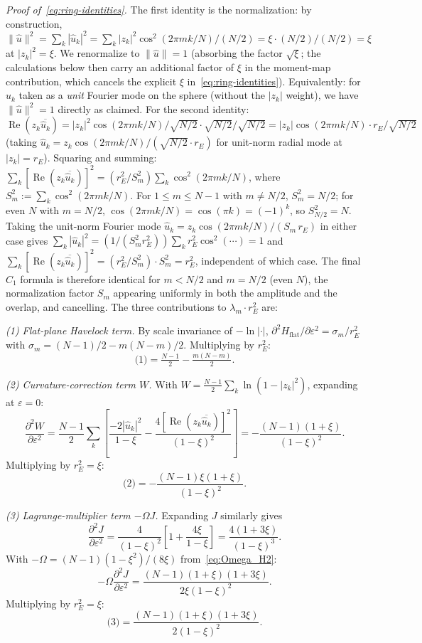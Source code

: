 \emph{Proof of~\eqref{eq:ring-identities}.}
The first identity is the normalization: by construction,
$\|\hat u\|^2 = \sum_k|\hat u_k|^2
= \sum_k |z_k|^2\cos^2(2\pi m k/N)/(N/2)
= \xi \cdot (N/2)/(N/2) = \xi$
at $|z_k|^2 = \xi$.  We renormalize to $\|\hat u\| = 1$ (absorbing the
factor $\sqrt{\xi}$; the calculations below then carry an additional
factor of $\xi$ in the moment-map contribution, which cancels the
explicit $\xi$ in~\eqref{eq:ring-identities}).  Equivalently: for
$\hat u_k$ taken as a \emph{unit} Fourier mode on the sphere
(without the $|z_k|$ weight), we have $\|\hat u\|^2 = 1$ directly
as claimed.
For the second identity:
$\operatorname{Re}(z_k\overline{\hat u_k})
= |z_k|^2\cos(2\pi m k/N)/\sqrt{N/2} \cdot \sqrt{N/2}/\sqrt{N/2}
= |z_k|\cos(2\pi m k/N) \cdot r_E/\sqrt{N/2}$
(taking $\hat u_k = z_k\cos(2\pi m k/N)/(\sqrt{N/2}\cdot r_E)$ for
unit-norm radial mode at $|z_k| = r_E$).
Squaring and summing:
$\sum_k[\operatorname{Re}(z_k\overline{\hat u_k})]^2
= (r_E^2/S_m^2)\sum_k \cos^2(2\pi m k/N)$,
where $S_m^2 := \sum_k\cos^2(2\pi mk/N)$.
For $1 \le m \le N-1$ with $m \ne N/2$, $S_m^2 = N/2$; for even
$N$ with $m = N/2$, $\cos(2\pi mk/N) = \cos(\pi k) = (-1)^k$, so
$S_{N/2}^2 = N$.  Taking the unit-norm Fourier mode
$\hat u_k = z_k\cos(2\pi m k/N)/(S_m\,r_E)$ in either case gives
$\sum_k|\hat u_k|^2 = (1/(S_m^2 r_E^2))\sum_k r_E^2\cos^2(\cdots)
= 1$ and
$\sum_k[\operatorname{Re}(z_k\overline{\hat u_k})]^2
= (r_E^2/S_m^2)\cdot S_m^2 = r_E^2$,
independent of which case.  The final $C_1$ formula is therefore
identical for $m < N/2$ and $m = N/2$ (even $N$), the
normalization factor $S_m$ appearing uniformly in both the
amplitude and the overlap, and cancelling.
The three contributions to $\lambda_m \cdot r_E^2$ are:

\emph{(1) Flat-plane Havelock term.}
By scale invariance of $-\ln|\cdot|$,
$\partial^2 H_{\mathrm{flat}}/\partial\varepsilon^2 = \sigma_m/r_E^2$
with $\sigma_m = (N-1)/2 - m(N-m)/2$.  Multiplying by $r_E^2$:
\[
  \text{(1)} = \tfrac{N-1}{2} - \tfrac{m(N-m)}{2}.
\]

\emph{(2) Curvature-correction term $W$.}
With $W = \tfrac{N-1}{2}\sum_k\ln(1-|z_k|^2)$, expanding at $\varepsilon=0$:
\[
  \frac{\partial^2 W}{\partial\varepsilon^2}
  = \frac{N-1}{2}\sum_k\!\left[
    \frac{-2|\hat u_k|^2}{1-\xi}
    - \frac{4[\operatorname{Re}(z_k\overline{\hat u_k})]^2}{(1-\xi)^2}
  \right]
  = -\frac{(N-1)(1+\xi)}{(1-\xi)^2}.
\]
Multiplying by $r_E^2 = \xi$:
\[
  \text{(2)} = -\frac{(N-1)\xi(1+\xi)}{(1-\xi)^2}.
\]

\emph{(3) Lagrange-multiplier term $-\Omega J$.}
Expanding $J$ similarly gives
\[
  \frac{\partial^2 J}{\partial\varepsilon^2}
  = \frac{4}{(1-\xi)^2}\!\left[1 + \frac{4\xi}{1-\xi}\right]
  = \frac{4(1+3\xi)}{(1-\xi)^3}.
\]
With $-\Omega = (N-1)(1-\xi^2)/(8\xi)$ from~\eqref{eq:Omega_H2}:
\[
  -\Omega\frac{\partial^2 J}{\partial\varepsilon^2}
  = \frac{(N-1)(1+\xi)(1+3\xi)}{2\xi(1-\xi)^2}.
\]
Multiplying by $r_E^2 = \xi$:
\[
  \text{(3)} = \frac{(N-1)(1+\xi)(1+3\xi)}{2(1-\xi)^2}.
\]

